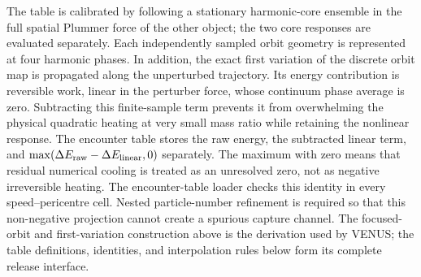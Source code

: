 The table is calibrated by following a stationary harmonic-core ensemble in
the full spatial Plummer force of the other object; the two core responses
are evaluated separately.  Each independently sampled orbit geometry is
represented at four harmonic phases.  In addition, the exact first variation
of the discrete orbit map is propagated along the unperturbed trajectory.
Its energy contribution is reversible work, linear in the perturber force,
whose continuum phase average is zero.  Subtracting this finite-sample term
prevents it from overwhelming the physical quadratic heating at very small
mass ratio while retaining the nonlinear response.  The encounter table
stores the raw energy, the subtracted linear term, and
\(\max(\Delta E_{\rm raw}-\Delta E_{\rm linear},0)\) separately.  The maximum
with zero means that residual numerical cooling is treated as an unresolved
zero, not as negative irreversible heating.  The encounter-table loader
checks this identity in every speed--pericentre cell.  Nested particle-number
refinement is required so that this non-negative projection cannot create a
spurious capture channel.  The focused-orbit and first-variation construction
above is the derivation used by VENUS; the table definitions, identities,
and interpolation rules below form its complete release interface.


